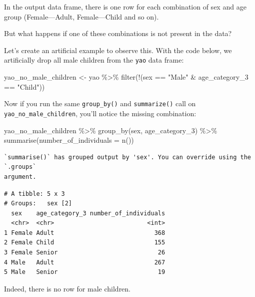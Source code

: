 \documentclass[
  letterpaper,
  DIV=11,
  numbers=noendperiod]{scrreprt}
\newenvironment{Shaded}{\begin{snugshade}}{\end{snugshade}}
\newcommand{\AttributeTok}[1]{\textcolor[rgb]{0.40,0.45,0.13}{#1}}
\newcommand{\FunctionTok}[1]{\textcolor[rgb]{0.28,0.35,0.67}{#1}}
\newcommand{\NormalTok}[1]{\textcolor[rgb]{0.00,0.23,0.31}{#1}}
\newcommand{\OtherTok}[1]{\textcolor[rgb]{0.00,0.23,0.31}{#1}}
\newcommand{\SpecialCharTok}[1]{\textcolor[rgb]{0.37,0.37,0.37}{#1}}
\newcommand{\StringTok}[1]{\textcolor[rgb]{0.13,0.47,0.30}{#1}}
\begin{document}
In the output data frame, there is one row for each combination of sex
and age group (Female---Adult, Female---Child and so on).

But what happens if one of these combinations is not present in the
data?

Let's create an artificial example to observe this. With the code below,
we artificially drop all male children from the \texttt{yao} data frame:

\begin{Shaded}
\begin{Highlighting}[]
\NormalTok{yao\_no\_male\_children }\OtherTok{\textless{}{-}} 
\NormalTok{  yao }\SpecialCharTok{\%\textgreater{}\%} 
  \FunctionTok{filter}\NormalTok{(}\SpecialCharTok{!}\NormalTok{(sex }\SpecialCharTok{==} \StringTok{"Male"} \SpecialCharTok{\&}\NormalTok{ age\_category\_3 }\SpecialCharTok{==} \StringTok{"Child"}\NormalTok{))}
\end{Highlighting}
\end{Shaded}

Now if you run the same \texttt{group\_by()} and \texttt{summarize()}
call on \texttt{yao\_no\_male\_children}, you'll notice the missing
combination:

\begin{Shaded}
\begin{Highlighting}[]
\NormalTok{yao\_no\_male\_children }\SpecialCharTok{\%\textgreater{}\%} 
  \FunctionTok{group\_by}\NormalTok{(sex, age\_category\_3) }\SpecialCharTok{\%\textgreater{}\%} 
  \FunctionTok{summarise}\NormalTok{(}\AttributeTok{number\_of\_individuals =} \FunctionTok{n}\NormalTok{())}
\end{Highlighting}
\end{Shaded}

\begin{verbatim}
`summarise()` has grouped output by 'sex'. You can override using the `.groups`
argument.
\end{verbatim}

\begin{verbatim}
# A tibble: 5 x 3
# Groups:   sex [2]
  sex    age_category_3 number_of_individuals
  <chr>  <chr>                          <int>
1 Female Adult                            368
2 Female Child                            155
3 Female Senior                            26
4 Male   Adult                            267
5 Male   Senior                            19
\end{verbatim}

Indeed, there is no row for male children.
\end{document}
